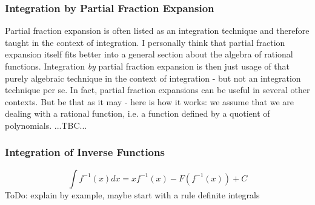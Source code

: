 

\subsubsection{Integration by Partial Fraction Expansion} 
Partial fraction expansion is often listed as an integration technique and therefore taught in the context of integration. I personally think that partial fraction expansion itself fits better into a general section about the algebra of rational functions. Integration \emph{by} partial fraction expansion is then just usage of that purely algebraic technique in the context of integration - but not an integration technique per se. In fact, partial fraction expansions can be useful in several other contexts. But be that as it may - here is how it works: we assume that we are dealing with a rational function, i.e. a function defined by a quotient of polynomials. ...TBC...




\subsubsection{Integration of Inverse Functions}
\begin{equation}
\int f^{-1}(x) dx = x f^{-1}(x) - F( f^{-1}(x) ) + C
\end{equation}
ToDo: explain by example, maybe start with a rule definite integrals






